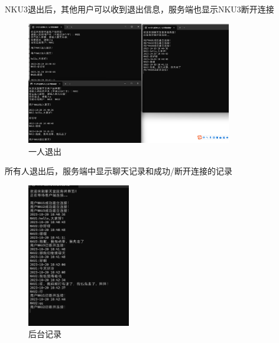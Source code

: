 \documentclass[UTF8,a4paper,10pt]{ctexart}
\begin{document}
NKU3退出后，其他用户可以收到退出信息，服务端也显示NKU3断开连接
\begin{figure}[H]
    \centering
\includegraphics[width=0.8\textwidth]{img/一人退出.png}
    \caption{一人退出}
\end{figure}
所有人退出后，服务端中显示聊天记录和成功/断开连接的记录
\begin{figure}[H]
    \centering
\includegraphics[width=0.4\textwidth]{img/后台记录.png}
    \caption{后台记录}
\end{figure}
\end{document}

